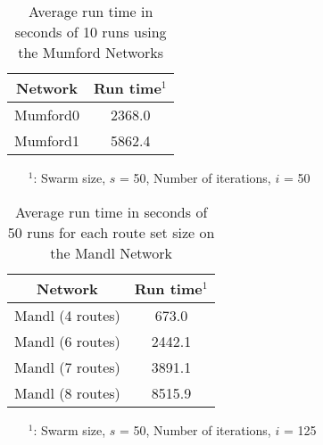 
\begin{table}[H]
    \centering
    \hspace*{-1.0cm}
    \begin{tabular}{|c|c|}
        \hline
        \textbf{Network} & \textbf{Run time$^1$ } \\
        \hline
        Mumford0 & 2368.0\\
        
        Mumford1 & 5862.4\\
        \hline
    \end{tabular}
    \caption{Average run time in seconds of 10 runs using the Mumford Networks}
    \label{tabel:runTimeMumford}
    \begin{itemize}[noitemsep]
    \item[$^1$:] Swarm size, $s$ = 50, Number of iterations, $i$ = 50
    \end{itemize} 
\end{table}

\begin{table}[H]
    \centering
    \hspace*{-1.0cm}
    \begin{tabular}{|c|c|}
        \hline
        \textbf{Network} & \textbf{Run time$^1$}\\
        \hline
        Mandl (4 routes) & 673.0\\
        
        Mandl (6 routes) & 2442.1\\
      
        Mandl (7 routes) & 3891.1\\
       
        Mandl (8 routes) & 8515.9\\
        \hline
    \end{tabular}
    \caption{Average run time in seconds of 50 runs for each route set size on the Mandl Network}
    \begin{itemize}[noitemsep]
    \item[$^1$:] Swarm size, $s$ = 50, Number of iterations, $i$ = 125
    \end{itemize} 
    \label{tabel:runTimeMandl}
\end{table}

